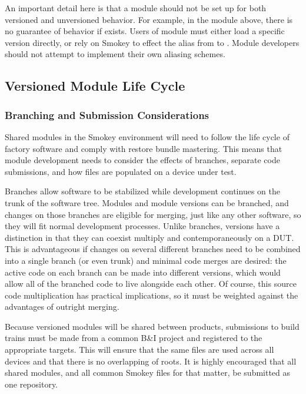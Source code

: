 An important detail here is that a module should not be set up for both
versioned and unversioned behavior.  For example, in the module 
above, there is no guarantee of behavior if
 exists.  Users of module  must
either load a specific version directly, or rely on Smokey to effect the alias
from  to .  Module developers should not attempt
to implement their own aliasing schemes.

\subsection{Versioned Module Life Cycle}

\subsubsection{Branching and Submission Considerations}

Shared modules in the Smokey environment will need to follow the life cycle of
factory software and comply with restore bundle mastering.  This means that
module development needs to consider the effects of branches, separate code
submissions, and how files are populated on a device under test.

Branches allow software to be stabilized while development continues on the
trunk of the software tree.  Modules and module versions can be branched, and
changes on those branches are eligible for merging, just like any other
software, so they will fit normal development processes.  Unlike branches,
versions have a distinction in that they can coexist multiply and
contemporaneously on a DUT.  This is advantageous if changes on several
different branches need to be combined into a single branch (or even trunk) and
minimal code merges are desired: the active code on each branch can be made
into different versions, which would allow all of the branched code to live
alongside each other.  Of course, this source code multiplication has practical
implications, so it must be weighted against the advantages of outright
merging.

Because versioned modules will be shared between products, submissions to build
trains must be made from a common B\&I project and registered to the appropriate
targets.  This will ensure that the same files are used across all devices and
that there is no overlapping of roots.  It is highly encouraged that all shared
modules, and all common Smokey files for that matter, be submitted as one
repository.

